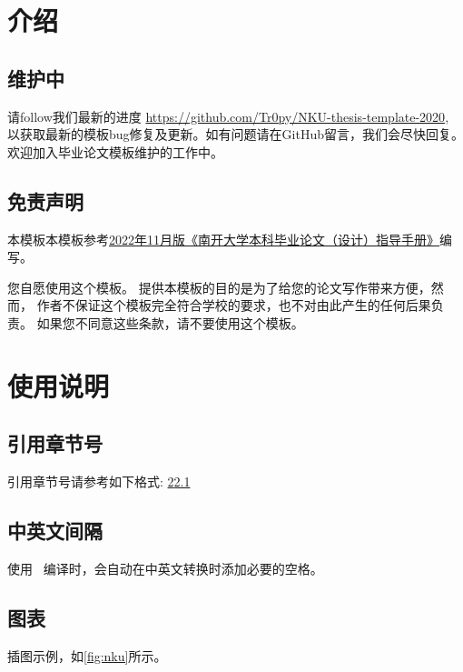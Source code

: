 \documentclass{nkuthesis}
\begin{document}
\tableofcontents


\section{介绍}

\subsection{维护中}

请follow我们最新的进度 \url{https://github.com/Tr0py/NKU-thesis-template-2020}, 
以获取最新的模板bug修复及更新。如有问题请在GitHub留言，我们会尽快回复。
欢迎加入毕业论文模板维护的工作中。

\subsection{免责声明}

本模板本模板参考\href{http://jwc.nankai.edu.cn/2022/1124/c24a497818/page.htm}
{2022年11月版《南开大学本科毕业论文（设计）指导手册》}编写。

您自愿使用这个模板。
提供本模板的目的是为了给您的论文写作带来方便，然而，
作者不保证这个模板完全符合学校的要求，也不对由此产生的任何后果负责。
如果您不同意这些条款，请不要使用这个模板。

\section{使用说明} \label{chpt:A}

\subsection{引用章节号}
\label{sec:ex:A}

引用章节号请参考如下格式: \ref{chpt:A}\ref{sec:ex:A}

\subsection{中英文间隔}

使用 \ 编译时，会自动在中英文转换时添加必要的空格。

\subsection{图表}

插图示例，如\ref{fig:nku}所示。
\end{document}
